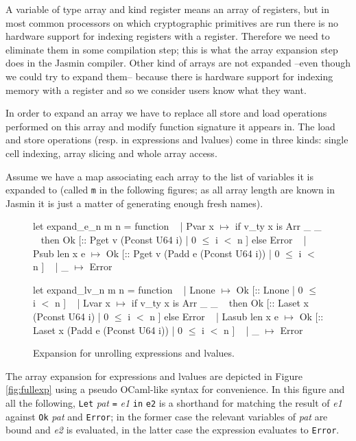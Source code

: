 \documentclass{article}
\begin{document}
A variable of type array and kind register means an array of registers, but in
most common processors on which cryptographic primitives are run there is no
hardware support for indexing registers with a register. Therefore we need to
eliminate them in some compilation step; this is what the array expansion step
does in the Jasmin compiler. Other kind of arrays are not expanded --even though
we could try to expand them-- because there is hardware support for indexing
memory with a register and so we consider users know what they want.

In order to expand an array we have to replace all store and load operations
performed on this array and modify function signature it appears in. The load
and store operations (resp. in expressions and lvalues) come in three kinds:
single cell indexing, array slicing and whole array access.

\smallskip

Assume we have a map associating each array to the list of variables it is
expanded to (called \texttt{m} in the following figures; as all array length are
known in Jasmin it is just a matter of generating enough fresh names).

\medskip

\begin{figure}[t]
\obeylines\obeyspaces\ttfamily%
let expand\_e\_n m n = function
~ | Pvar x       \(\mapsto\) if v\_ty x is Arr \_ \_
~   then Ok [:: Pget v (Pconst U64 i) | 0 \(\leq\) i \(<\) n ] else Error
~ | Psub len x e \(\mapsto\) Ok [:: Pget v (Padd e (Pconst U64 i)) | 0 \(\leq\) i \(<\) n ]
~ | \_            \(\mapsto\) Error
 
let expand\_lv\_n m n = function
~ | Lnone         \(\mapsto\) Ok [:: Lnone | 0 \(\leq\) i \(<\) n ]
~ | Lvar x        \(\mapsto\) if v\_ty x is Arr \_ \_
~   then Ok [:: Laset x (Pconst U64 i) | 0 \(\leq\) i \(<\) n ] else Error
~ | Lasub len x e \(\mapsto\) Ok [:: Laset x (Padd e (Pconst U64 i)) | 0 \(\leq\) i \(<\) n ]
~ | \_             \(\mapsto\) Error
\normalfont%
\caption{Expansion for unrolling expressions and lvalues.}\label{fig:unrexp}
\end{figure}

The array expansion for expressions and lvalues are depicted in Figure
\ref{fig:fullexp} using a pseudo OCaml-like syntax for convenience.
In this figure and all the following, \texttt{Let} \textit{pat} \texttt{=}
\textit{e1} \texttt{in} \texttt{e2} is a shorthand for matching the result of
\textit{e1} against \texttt{Ok} \textit{pat} and \texttt{Error}; in the former
case the relevant variables of \textit{pat} are bound and \textit{e2} is
evaluated, in the latter case the expression evaluates to \texttt{Error}.
\end{document}
